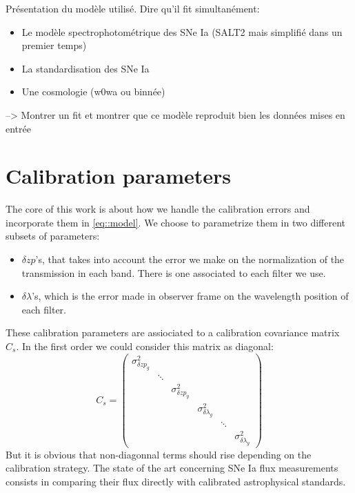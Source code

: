 \documentclass[\docopts]{\docclass}
\begin{document}
Présentation du modèle utilisé.
Dire qu'il fit simultanément:
\begin{itemize}
\item Le modèle spectrophotométrique des SNe Ia (SALT2 mais simplifié dans un premier temps)
\item La standardisation des SNe Ia
\item Une cosmologie (w0wa ou binnée)
\end{itemize}
--> Montrer un fit et montrer que ce modèle reproduit bien les données mises en entrée


\section{Calibration parameters}
\label{sec::calib_uncertainties}
The core of this work is about how we handle the calibration errors and incorporate them in \ref{eq::model}.
We choose to parametrize them in two different subsets of parameters:
\begin{itemize}
\item $\delta zp$'s, that takes into account the error we make on the normalization of the transmission in each band.
There is one associated to each filter we use.
\item $\delta \lambda$'s, which is the error made in observer frame on the wavelength position of each filter. 
\end{itemize}
These calibration parameters are assiociated to a calibration covariance matrix $C_s$.
In the first order we could consider this matrix as diagonal:
\begin{equation}
C_s = 
\begin{pmatrix}
   \sigma^2_{\delta zp_{g}} & \ & \ & \ & \ & \ \\
   \ & \ddots & \ & \ & \ & \ \\
   \ & \ & \sigma^2_{\delta zp_{y}} & \ & \ & \ \\
   \ & \ & \ & \sigma^2_{\delta\lambda_{g}} & \ & \ \\
   \ & \ & \ & \ & \ddots & \ \\
   \ & \ & \ & \ & \ & \sigma^2_{\delta\lambda_{y}}
\end{pmatrix}
\end{equation}
But it is obvious that non-diagonnal terms should rise depending on the calibration strategy.
The state of the art concerning SNe Ia flux measurements consists in comparing their flux directly with calibrated astrophysical standards.
\end{document}
